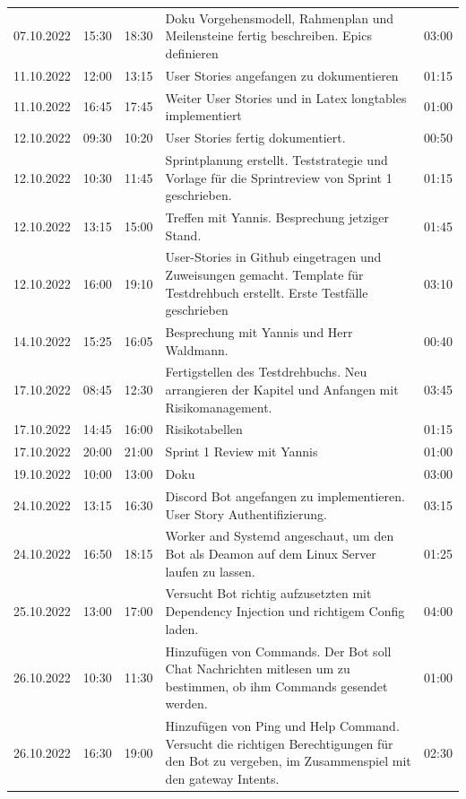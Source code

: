 \documentclass[a4paper, table]{article}
\begin{document}
\begin{longtable}[h]{|l|l|l|p{20em}|l|}
    07.10.2022 & 15:30 & 18:30 & Doku Vorgehensmodell, Rahmenplan und Meilensteine   fertig beschreiben. Epics definieren & 03:00 \\
    11.10.2022 & 12:00 & 13:15 & User Stories angefangen zu dokumentieren & 01:15 \\
    11.10.2022 & 16:45 & 17:45 & Weiter User Stories und   in Latex longtables implementiert & 01:00 \\
    12.10.2022 & 09:30 & 10:20 & User Stories fertig   dokumentiert. & 00:50 \\
    12.10.2022 & 10:30 & 11:45 & Sprintplanung erstellt. Teststrategie und Vorlage   für die Sprintreview von Sprint 1 geschrieben. & 01:15 \\
    12.10.2022 & 13:15 & 15:00 & Treffen mit Yannis. Besprechung jetziger Stand. & 01:45 \\
    12.10.2022 & 16:00 & 19:10 & User-Stories in Github eingetragen und Zuweisungen   gemacht. Template für Testdrehbuch erstellt. Erste Testfälle geschrieben & 03:10 \\
    14.10.2022 & 15:25 & 16:05 & Besprechung mit Yannis und Herr Waldmann. & 00:40 \\
    17.10.2022 & 08:45 & 12:30 & Fertigstellen des Testdrehbuchs. Neu arrangieren   der Kapitel und Anfangen mit Risikomanagement. & 03:45 \\
    17.10.2022 & 14:45 & 16:00 & Risikotabellen & 01:15 \\
    17.10.2022 & 20:00 & 21:00 & Sprint 1 Review mit   Yannis & 01:00  \\
    19.10.2022 & 10:00 & 13:00 & Doku & 03:00  \\
    24.10.2022 & 13:15 & 16:30 & Discord Bot angefangen zu implementieren. User Story   Authentifizierung. & 03:15 \\
    24.10.2022 & 16:50 & 18:15 & Worker and Systemd angeschaut, um den Bot als   Deamon auf dem Linux Server laufen zu lassen. & 01:25 \\
    25.10.2022 & 13:00 & 17:00 & Versucht Bot richtig aufzusetzten mit Dependency   Injection und richtigem Config laden. & 04:00 \\
    26.10.2022 & 10:30 & 11:30 & Hinzufügen von Commands. Der Bot soll Chat   Nachrichten mitlesen um zu bestimmen, ob ihm Commands gesendet werden. & 01:00 \\
    26.10.2022 & 16:30 & 19:00 & Hinzufügen von Ping und Help Command. Versucht   die richtigen Berechtigungen für den Bot zu vergeben, im Zusammenspiel mit   den gateway Intents. & 02:30   \\

\end{longtable}
\end{document}
